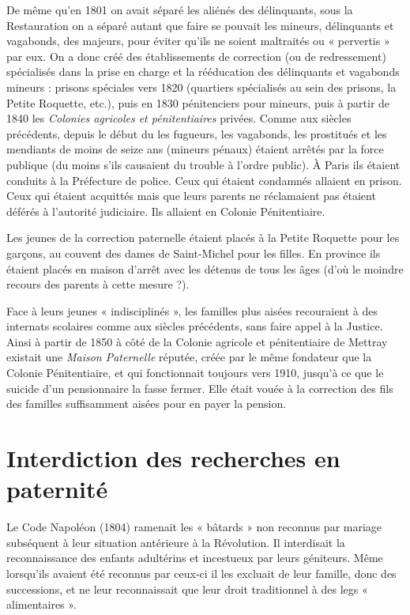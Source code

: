  De même qu'en 1801 on avait séparé les aliénés des délinquants, sous la Restauration on a séparé autant que faire se pouvait les mineurs, délinquants et vagabonds, des majeurs, pour éviter qu'ils ne soient maltraités ou « pervertis » par eux. On a donc créé des établissements de correction (ou de redressement) spécialisés dans la prise en charge et la rééducation des délinquants et vagabonds mineurs : prisons spéciales vers 1820 (quartiers spécialisés au sein des prisons, la Petite Roquette, etc.), puis en 1830 pénitenciers pour mineurs, puis à partir de 1840 les \emph{Colonies agricoles et pénitentiaires} privées. Comme aux siècles précédents, depuis le début du  les fugueurs, les vagabonds, les prostitués et les mendiants de moins de seize ans (mineurs pénaux) étaient arrêtés par la force publique (du moins s'ils causaient du trouble à l'ordre public). À Paris ils étaient conduits à la Préfecture de police. Ceux qui étaient condamnés allaient en prison. Ceux qui étaient acquittés mais que leurs parents ne réclamaient pas étaient déférés à l'autorité judiciaire. Ils allaient en Colonie Pénitentiaire.

 Les jeunes de la correction paternelle étaient placés à la Petite Roquette pour les garçons, au couvent des dames de Saint-Michel pour les filles. En province ils étaient placés en maison d'arrêt avec les détenus de tous les âges (d'où le moindre recours des parents à cette mesure ?). 

 Face à leurs jeunes « indisciplinés », les familles plus aisées recouraient à des internats scolaires comme aux siècles précédents, sans faire appel à la Justice. Ainsi à partir de 1850 à côté de la Colonie agricole et pénitentiaire de Mettray existait une \emph{Maison Paternelle} réputée, créée par le même fondateur que la Colonie Pénitentiaire, et qui fonctionnait toujours vers 1910, jusqu'à ce que le suicide d'un pensionnaire la fasse fermer. Elle était vouée à la correction des fils des familles suffisamment aisées pour en payer la pension.

\section{Interdiction des recherches en paternité}

 Le Code Napoléon (1804) ramenait les « bâtards » non reconnus par mariage subséquent à leur situation antérieure à la Révolution. Il interdisait la reconnaissance des enfants adultérins et incestueux par leurs géniteurs. Même lorsqu'ils avaient été reconnus par ceux-ci il les excluait de leur famille, donc des successions, et ne leur reconnaissait que leur droit traditionnel à des legs « alimentaires ». 

